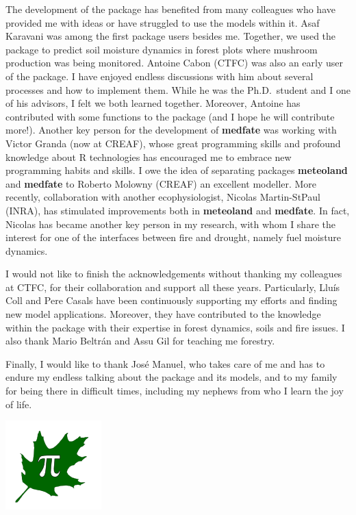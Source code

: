 \documentclass[]{book}
\begin{document}
The development of the package has benefited from many colleagues who
have provided me with ideas or have struggled to use the models within
it. Asaf Karavani was among the first package users besides me.
Together, we used the package to predict soil moisture dynamics in
forest plots where mushroom production was being monitored. Antoine
Cabon (CTFC) was also an early user of the package. I have enjoyed
endless discussions with him about several processes and how to
implement them. While he was the Ph.D.~student and I one of his
advisors, I felt we both learned together. Moreover, Antoine has
contributed with some functions to the package (and I hope he will
contribute more!). Another key person for the development of
\textbf{medfate} was working with Victor Granda (now at CREAF), whose
great programming skills and profound knowledge about R technologies has
encouraged me to embrace new programming habits and skills. I owe the
idea of separating packages \textbf{meteoland} and \textbf{medfate} to
Roberto Molowny (CREAF) an excellent modeller. More recently,
collaboration with another ecophysiologist, Nicolas Martin-StPaul
(INRA), has stimulated improvements both in \textbf{meteoland} and
\textbf{medfate}. In fact, Nicolas has became another key person in my
research, with whom I share the interest for one of the interfaces
between fire and drought, namely fuel moisture dynamics.

I would not like to finish the acknowledgements without thanking my
colleagues at CTFC, for their collaboration and support all these years.
Particularly, Lluís Coll and Pere Casals have been continuously
supporting my efforts and finding new model applications. Moreover, they
have contributed to the knowledge within the package with their
expertise in forest dynamics, soils and fire issues. I also thank Mario
Beltrán and Assu Gil for teaching me forestry.

Finally, I would like to thank José Manuel, who takes care of me and has
to endure my endless talking about the package and its models, and to my
family for being there in difficult times, including my nephews from who
I learn the joy of life.

\begin{center}\includegraphics[width=0.2\linewidth]{LOGO_Group} \end{center}
\end{document}
